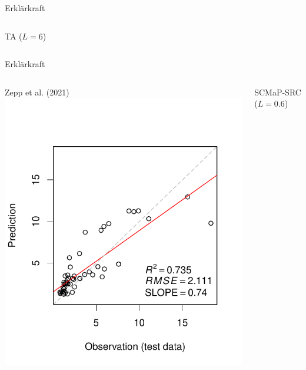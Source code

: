 \begin{frame}{Erklärkraft}
\begin{columns}
\begin{block}{\alert{TA} ($L=6$)}
\end{block}
\end{columns}
\end{frame}


\begin{frame}{Erklärkraft}
\begin{columns}
\column{5.5cm}
\begin{block}{Zepp et al. (2021)}
\centering\includegraphics[width=1\textwidth]{FIGURE/Figure_Model_Accuracy-testsite.pdf}
\end{block}
\column{5.5cm}
\begin{block}{\alert{SCMaP-SRC} ($L=0.6$)}

\end{block}
\end{columns}
\end{frame}
